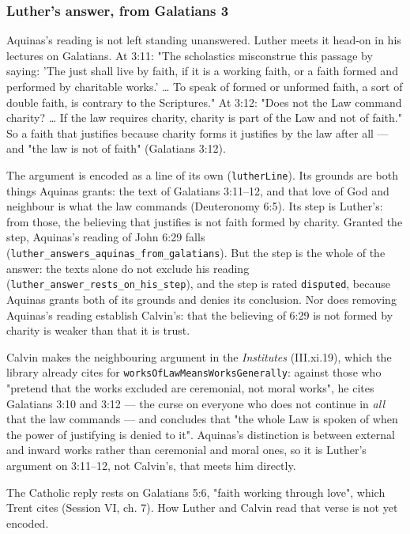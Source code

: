 \documentclass[11pt]{article}
\begin{document}
\subsubsection*{Luther's answer, from Galatians 3}
Aquinas's reading is not left standing unanswered. Luther meets it head-on in his lectures on Galatians. At 3:11: "The scholastics misconstrue this passage by saying: 'The just shall live by faith, if it is a working faith, or a faith formed and performed by charitable works.' … To speak of formed or unformed faith, a sort of double faith, is contrary to the Scriptures." At 3:12: "Does not the Law command charity? … If the law requires charity, charity is part of the Law and not of faith." So a faith that justifies because charity forms it justifies by the law after all — and "the law is not of faith" (Galatians 3:12).

The argument is encoded as a line of its own (\texttt{luther\allowbreak{}Line}). Its grounds are both things Aquinas grants: the text of Galatians 3:11–12, and that love of God and neighbour is what the law commands (Deuteronomy 6:5). Its step is Luther's: from those, the believing that justifies is not faith formed by charity. Granted the step, Aquinas's reading of John 6:29 falls (\texttt{luther\_\allowbreak{}answers\_\allowbreak{}aquinas\_\allowbreak{}from\_\allowbreak{}galatians}). But the step is the whole of the answer: the texts alone do not exclude his reading (\texttt{luther\_\allowbreak{}answer\_\allowbreak{}rests\_\allowbreak{}on\_\allowbreak{}his\_\allowbreak{}step}), and the step is rated \texttt{disputed}, because Aquinas grants both of its grounds and denies its conclusion. Nor does removing Aquinas's reading establish Calvin's: that the believing of 6:29 is not formed by charity is weaker than that it is trust.

Calvin makes the neighbouring argument in the \emph{Institutes} (III.xi.19), which the library already cites for \texttt{works\allowbreak{}Of\allowbreak{}Law\allowbreak{}Means\allowbreak{}Works\allowbreak{}Generally}: against those who "pretend that the works excluded are ceremonial, not moral works", he cites Galatians 3:10 and 3:12 — the curse on everyone who does not continue in \emph{all} that the law commands — and concludes that "the whole Law is spoken of when the power of justifying is denied to it". Aquinas's distinction is between external and inward works rather than ceremonial and moral ones, so it is Luther's argument on 3:11–12, not Calvin's, that meets him directly.

The Catholic reply rests on Galatians 5:6, "faith working through love", which Trent cites (Session VI, ch. 7). How Luther and Calvin read that verse is not yet encoded.
\end{document}
